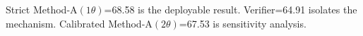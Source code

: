 Strict Method-A$(1\theta)$=68.58 is the deployable result.
Verifier=64.91 isolates the mechanism.
Calibrated Method-A$(2\theta)$=67.53 is sensitivity analysis.
